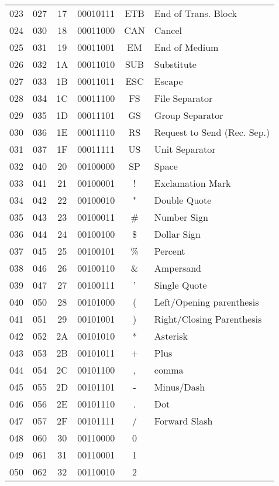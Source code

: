 \documentclass{article}
\begin{document}
\begin{longtable}{|c|c|c|c|c|l|}
       023 & 027 & 17 & 00010111 & ETB & End of Trans. Block\\
       024 & 030 & 18 & 00011000 & CAN & Cancel\\
       025 & 031 & 19 & 00011001 & EM  & End of Medium\\
       026 & 032 & 1A & 00011010 & SUB & Substitute\\
       027 & 033 & 1B & 00011011 & ESC & Escape\\
       028 & 034 & 1C & 00011100 & FS  & File Separator\\
       029 & 035 & 1D & 00011101 & GS  & Group Separator\\
       030 & 036 & 1E & 00011110 & RS  & Request to Send (Rec. Sep.)\\
       031 & 037 & 1F & 00011111 & US  & Unit Separator\\
       032 & 040 & 20 & 00100000 & SP  & Space\\
       033 & 041 & 21 & 00100001 & !   & Exclamation Mark\\
       034 & 042 & 22 & 00100010 & "   & Double Quote\\
       035 & 043 & 23 & 00100011 & \#  & Number Sign\\
       036 & 044 & 24 & 00100100 & \$  & Dollar Sign\\
       037 & 045 & 25 & 00100101 & \%  & Percent\\
       038 & 046 & 26 & 00100110 & \&  & Ampersand\\
       039 & 047 & 27 & 00100111 & '   & Single Quote\\
       040 & 050 & 28 & 00101000 & (   & Left/Opening parenthesis\\
       041 & 051 & 29 & 00101001 & )   & Right/Closing Parenthesis\\
       042 & 052 & 2A & 00101010 & *   & Asterisk\\
       043 & 053 & 2B & 00101011 & +   & Plus\\
       044 & 054 & 2C & 00101100 & ,   & comma\\
       045 & 055 & 2D & 00101101 & -   & Minus/Dash\\
       046 & 056 & 2E & 00101110 & .   & Dot\\
       047 & 057 & 2F & 00101111 & /   & Forward Slash\\
       048 & 060 & 30 & 00110000 & 0   & \\
       049 & 061 & 31 & 00110001 & 1   & \\
       050 & 062 & 32 & 00110010 & 2   & \\

\end{longtable}
\end{document}
